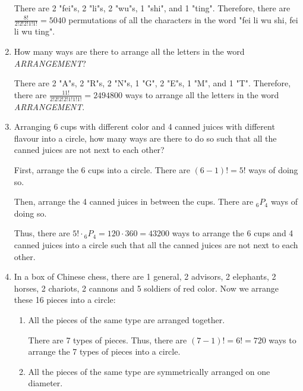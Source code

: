 \documentclass{report}
\newcommand\permtwo[2][^n]{{}_{#1}P_{#2}}
\begin{document}
\begin{multicols}{2}
\begin{enumerate}
          There are 2 "fei"s, 2 "li"s, 2 "wu"s, 1 "shi", and 1 "ting". Therefore, there
          are $\frac{8!}{2!2!2!1!1!} = 5040$ permutations of all the characters in the
          word "fei li wu shi, fei li wu ting".

    \item How many ways are there to arrange all the letters in the word
          \textit{ARRANGEMENT}? \sol{}

          There are 2 "A"s, 2 "R"s, 2 "N"s, 1 "G", 2 "E"s, 1 "M", and 1 "T". Therefore,
          there are $\frac{11!}{2!2!2!2!1!1!1!} = 2494800$ ways to arrange all the
          letters in the word \textit{ARRANGEMENT}.

    \item Arranging 6 cups with different color and 4 canned juices with different
          flavour into a circle, how many ways are there to do so such that all the
          canned juices are not next to each other? \sol{}

          First, arrange the 6 cups into a circle. There are $(6-1)! = 5!$ ways of doing
          so.

          Then, arrange the 4 canned juices in between the cups. There are
          $\permtwo[6]{4}$ ways of doing so.

          Thus, there are $5! \cdot \permtwo[6]{4} = 120 \cdot 360 = 43200$ ways to
          arrange the 6 cups and 4 canned juices into a circle such that all the canned
          juices are not next to each other.

    \item In a box of Chinese chess, there are 1 general, 2 advisors, 2 elephants, 2
          horses, 2 chariots, 2 cannons and 5 soldiers of red color. Now we arrange these
          16 pieces into a circle:
          \begin{enumerate}
            \item All the pieces of the same type are arranged together. \sol{}

                  There are 7 types of pieces. Thus, there are $(7-1)! = 6! = 720$ ways to
                  arrange the 7 types of pieces into a circle.

            \item All the pieces of the same type are symmetrically arranged on one diameter.
                  \sol{}


\end{enumerate}
\end{enumerate}
\end{multicols}
\end{document}
